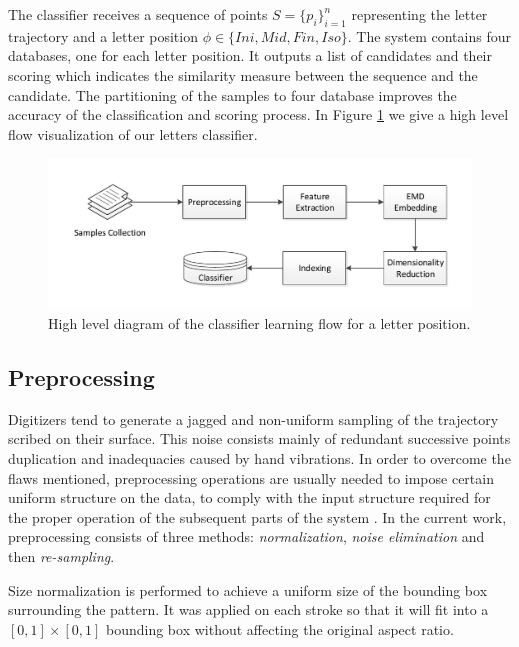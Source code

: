 \documentclass[10pt, conference, compsocconf]{IEEEtran}
\theoremstyle{definition}
\begin{document}
The classifier receives a sequence of points $S=\{p_{i}\}_{i=1}^{n}$ representing the letter trajectory and a letter position $\phi \in \{Ini, Mid, Fin, Iso\}$.
The system contains four databases, one for each letter position. 
It outputs a list of candidates and their scoring which indicates the similarity measure between the sequence and the candidate.
The partitioning of the samples to four database improves the accuracy of the classification and scoring process.
In Figure \ref{fig:letters_classifier_learning_flow} we give a high level flow visualization of our letters classifier.

\begin{figure}
\centering
\includegraphics[width=1\columnwidth]{./figures/letters_classifier_learning_flow}       
\caption{High level diagram of the classifier learning flow for a letter position.}
\label{fig:letters_classifier_learning_flow}
\end{figure}
 
\subsection{Preprocessing}
Digitizers tend to generate a jagged and non-uniform sampling of the trajectory scribed on their surface.
This noise consists mainly of redundant successive points duplication and inadequacies caused by hand vibrations. 
In order to overcome the flaws mentioned, preprocessing operations are usually needed to impose certain uniform structure on the data, to comply with the input structure required for the proper operation of the subsequent parts of the system \cite{al2011online}. 
In the current work, preprocessing consists of three methods: \emph{normalization}, \emph{noise elimination} and then \emph{re-sampling}.

Size normalization is performed to achieve a uniform size of the bounding box surrounding the pattern. 
It was applied on each stroke so that it will fit into a $[0,1]\times[0,1]$ bounding box without affecting the original aspect ratio. 
\end{document}

